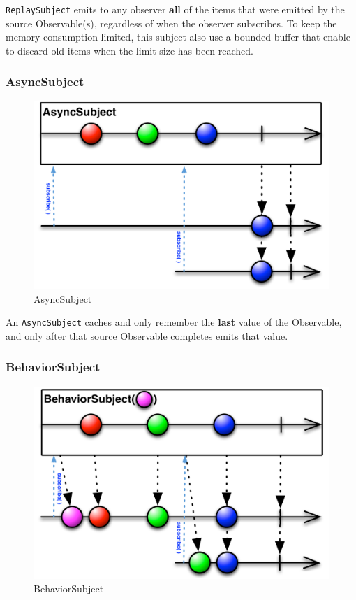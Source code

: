 \texttt{ReplaySubject} emits to any observer \textbf{all} of the items
that were emitted by the source Observable(s), regardless of when the
observer subscribes. To keep the memory consumption limited, this subject
also use a bounded buffer that enable to discard old items when the
limit size has been reached.

\subsubsection{AsyncSubject}\label{asyncsubject}

\begin{figure}[htbp]
\centering
\includegraphics[scale=0.5]{imgs/asyncsubj.png}
\caption{AsyncSubject}
\end{figure}

An \texttt{AsyncSubject} caches and only remember the \textbf{last}
value of the Observable, and only after that source Observable completes
emits that value.

\subsubsection{BehaviorSubject}\label{behaviorsubject}

\begin{figure}[htbp]
\centering
\includegraphics[scale=0.5]{imgs/behasubj.png}
\caption{BehaviorSubject}
\end{figure}

